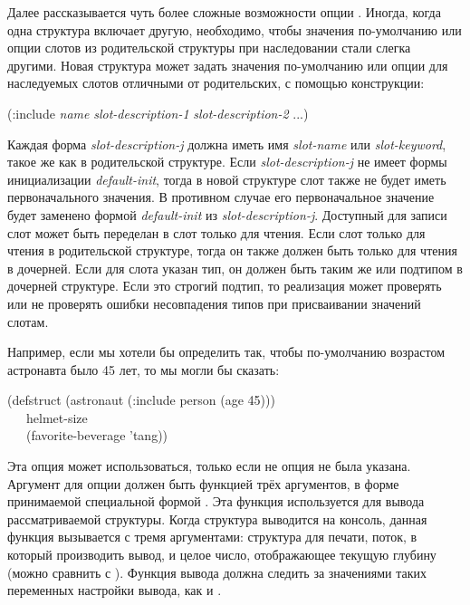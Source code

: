 \begin{flushdesc}
Далее рассказывается чуть более сложные возможности опции .
Иногда, когда одна структура включает другую, необходимо, чтобы значения
по-умолчанию или опции слотов из родительской структуры при наследовании
стали слегка другими.  Новая структура может задать значения по-умолчанию или
опции для наследуемых слотов отличными от родительских, с помощью конструкции:
\begin{lisp}
(:include \emph{name} \emph{slot-description-1} \emph{slot-description-2} ...)
\end{lisp}
Каждая форма \emph{slot-description-j} должна иметь имя \emph{slot-name} или
\emph{slot-keyword}, такое же как в родительской структуре.
Если \emph{slot-description-j} не имеет формы инициализации \emph{default-init},
тогда в новой структуре слот также не будет иметь первоначального значения. В
противном случае его первоначальное значение будет заменено формой
\emph{default-init} из \emph{slot-description-j}.
Доступный для записи слот может быть переделан в слот только для чтения.
Если слот только для чтения в родительской структуре, тогда он также должен быть
только для чтения в дочерней.
Если для слота указан тип, он должен быть таким же или подтипом в
дочерней структуре. Если это строгий подтип, то реализация может проверять или
не проверять ошибки несовпадения типов при присваивании значений слотам.

Например, если мы хотели бы определить  так, чтобы по-умолчанию
возрастом астронавта было 45 лет, то мы могли бы сказать:
\begin{lisp}
(defstruct (astronaut (:include person (age 45))) \\
~~~helmet-size \\
~~~(favorite-beverage 'tang))
\end{lisp}

\item[\cd{:print-function}]
Эта опция может использоваться, только если не опция  не была указана.
Аргумент для опции  должен быть функцией трёх аргументов, в
форме принимаемой специальной формой . Эта функция используется
для вывода рассматриваемой структуры.
Когда структура выводится на консоль, данная функция вызывается с тремя
аргументами:
структура для печати,
поток, в который производить вывод,
и целое число, отображающее текущую глубину (можно сравнить с
).
Функция вывода должна следить за значениями таких переменных настройки вывода,
как  и .


\end{flushdesc}
